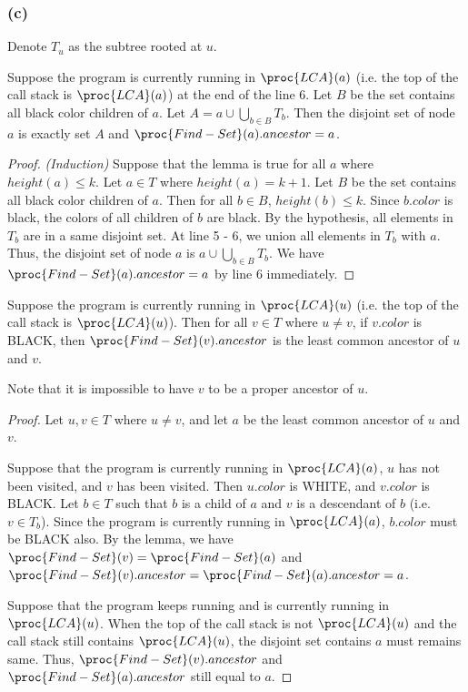 \subsubsection*{(c)}

Denote $T_u$ as the subtree rooted at $u$.

\begin{lemma}
    Suppose the program is currently running in $\proc{LCA}(a)$
    (i.e. the top of the call stack is $\proc{LCA}(a)$) at the end of the line 6.
    Let $B$ be the set contains all black color children of $a$.
    Let $A = a \cup \bigcup\limits_{b \in B} T_b$.
    Then the disjoint set of node $a$ is exactly set $A$  
    and $\proc{Find-Set}(a).ancestor = a$.
\end{lemma}

\begin{proof}
    \textit{(Induction)}
    Suppose that the lemma is true for all $a$ where $height(a) \leq k$.
    Let $a \in T$ where $height(a) = k + 1$.
    Let $B$ be the set contains all black color children of $a$.
    Then for all $b \in B$, $height(b) \leq k$.
    Since $b.color$ is black, the colors of all children of $b$ are black.
    By the hypothesis, all elements in $T_b$ are in a same disjoint set.
    At line 5 - 6, we union all elements in $T_b$ with $a$.
    Thus, the disjoint set of node $a$ is $a \cup \bigcup\limits_{b \in B} T_b$.
    We have $\proc{Find-Set}(a).ancestor = a$ by line 6 immediately.
\end{proof}

\begin{claim}
    Suppose the program is currently running in $\proc{LCA}(u)$
    (i.e. the top of the call stack is $\proc{LCA}(u)$).
    Then for all $v \in T$ where $u \neq v$, if $v.color$ is BLACK,
    then $\proc{Find-Set}(v).ancestor$ is the least common ancestor of $u$ and $v$.
\end{claim}

Note that it is impossible to have $v$ to be a proper ancestor of $u$.

\begin{proof}
    Let $u, v \in T$ where $u \neq v$, and let $a$ be the least common ancestor of $u$ and $v$.

    Suppose that the program is currently running in $\proc{LCA}(a)$,
    $u$ has not been visited, and $v$ has been visited.
    Then $u.color$ is WHITE, and $v.color$ is BLACK.
    Let $b \in T$ such that $b$ is a child of $a$ and $v$ is a descendant of $b$ 
    (i.e. $v \in T_b$). 
    Since the program is currently running in $\proc{LCA}(a)$,
    $b.color$ must be BLACK also.
    By the lemma, we have $\proc{Find-Set}(v) = \proc{Find-Set}(a)$
    and $\proc{Find-Set}(v).ancestor = \proc{Find-Set}(a).ancestor = a$. 

    Suppose that the program keeps running and is currently running in $\proc{LCA}(u)$.
    When the top of the call stack is not $\proc{LCA}(u)$ 
    and the call stack still contains $\proc{LCA}(u)$,
    the disjoint set contains $a$ must remains same.
    Thus, $\proc{Find-Set}(v).ancestor$ and $\proc{Find-Set}(a).ancestor$ still equal to $a$.
\end{proof}

